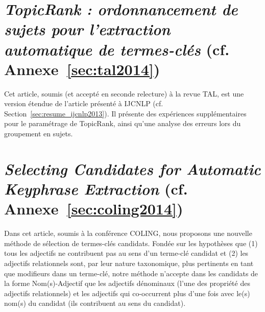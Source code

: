   \section{\textit{TopicRank : ordonnancement de sujets pour l'extraction
           automatique de termes-clés} (cf. Annexe~\ref{sec:tal2014})}
    Cet article, soumis (et accepté en seconde relecture) à la revue TAL, est
    une version étendue de l'article présenté à IJCNLP (cf.
    Section~\ref{sec:resume_ijcnlp2013}). Il présente des expériences
    supplémentaires pour le paramétrage de TopicRank, ainsi qu'une analyse des
    erreurs lors du groupement en sujets.

  \section{\textit{Selecting Candidates for Automatic Keyphrase Extraction} (cf.
           Annexe~\ref{sec:coling2014})}
    Dans cet article, soumis à la conférence COLING, nous proposons une nouvelle
    méthode de sélection de termes-clés candidats. Fondée sur les hypothèses que
    (1) tous les adjectifs ne contribuent pas au sens d'un terme-clé candidat
    et (2) les adjectifs relationnels sont, par leur nature taxonomique, plus
    pertinents en tant que modifieurs dans un terme-clé, notre méthode n'accepte
    dans les candidats de la forme Nom(s)-Adjectif que les adjectifs dénominaux
    (l'une des propriété des adjectifs relationnels) et les adjectifs qui
    co-occurrent plus d'une fois avec le(s) nom(s) du candidat (ils contribuent
    au sens du candidat).

